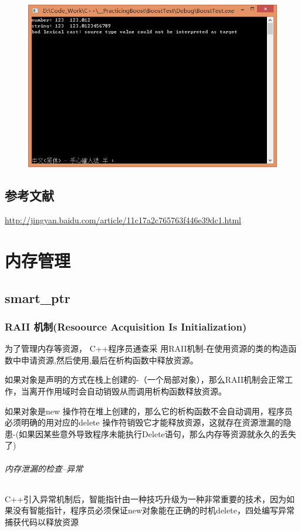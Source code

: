 \documentclass[UTF8,a4paper,12pt]{ctexbook}
\begin{document}
		 \begin{figure}[h]
		 	\centering
		 	\includegraphics[width=14cm,clip]{BoostTest.png}
		 \end{figure}
		 
	\section{参考文献}\url{http://jingyan.baidu.com/article/11c17a2c765763f446e39dc1.html}	 

\newpage
\chapter{内存管理}
	\section{smart\_ptr}
	
		\subsection{RAII 机制(Resoource Acquisition Is Initialization)}
			为了管理内存等资源， C++程序员通查采
			用RAII机制-在使用资源的类的构造函数中申请资源,然后使用,最后在析构函数中释放资源。
			
			如果对象是声明的方式在栈上创建的-（一个局部对象），那么RAII机制会正常工作，当离开作用域时会自动销毁从而调用析构函数释放资源。
			
			如果对象是new 操作符在堆上创建的，那么它的析构函数不会自动调用，程序员必须明确的用对应的delete 操作符销毁它才能释放资源，这就存在资源泄漏的隐患-(如果因某些意外导致程序未能执行Delete语句，那么内存等资源就永久的丢失了)
			
			\subparagraph{内存泄漏的检查--异常}
				C++引入异常机制后，智能指针由一种技巧升级为一种非常重要的技术，因为如果没有智能指针，程序员必须保证new对象能在正确的时机delete，四处编写异常捕获代码以释放资源
				
\end{document}

